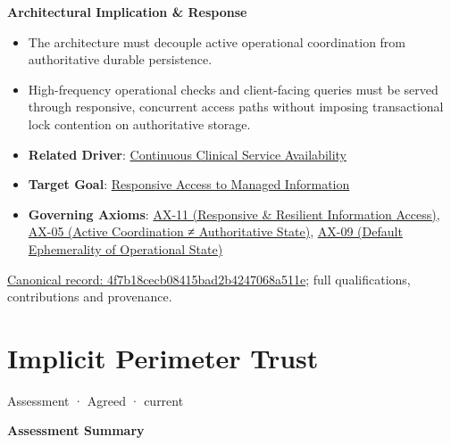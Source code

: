 \par\medskip\textbf{Architectural Implication \& Response}\par


\begin{itemize}


\item The architecture must decouple active operational coordination from authoritative durable persistence.

\item High-frequency operational checks and client-facing queries must be served through responsive, concurrent access paths without imposing transactional lock contention on authoritative storage.

\item \textbf{Related Driver}: \href{\detokenize{../../../../../docs/markdown/01-motivation/drivers-assessments/drivers.md}}{Continuous Clinical Service Availability}

\item \textbf{Target Goal}: \href{\detokenize{../../../../../docs/markdown/01-motivation/goals-outcomes/strategic-goals.md}}{Responsive Access to Managed Information}

\item \textbf{Governing Axioms}: \hyperref[element:8a1e995f16954484a78ae1c5c114d546]{AX-11 (Responsive \& Resilient Information Access)}, \hyperref[element:0412a2084f0145babc4f022c71fea65f]{AX-05 (Active Coordination ≠ Authoritative State)}, \hyperref[element:9a5cb9e8876844e58e660f909f7df9fc]{AX-09 (Default Ephemerality of Operational State)}

\end{itemize}

{\footnotesize \href{../../../../continuum/motivation/assessment/4f7b18cecb08415bad2b4247068a511e.md}{Canonical record: 4f7b18cecb08415bad2b4247068a511e}; full qualifications, contributions and provenance.}\par
\section{Implicit Perimeter Trust}

\label{element:f1b3b73329ae46b9b5105fb8ff236be5}
{\small Assessment · Agreed · current}\par

\par\medskip\textbf{Assessment Summary}\par



